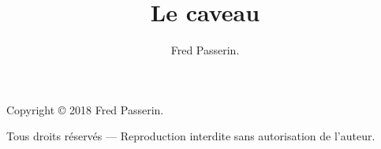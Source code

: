 \documentclass[a4paper,12pt,extrafontsizes,draft,twoside]{memoir}
\title{Le caveau}
\author{Fred Passerin.}
\date{}
\begin{document}
\maketitle


Copyright \copyright{} 2018 Fred Passerin.

\vspace{\baselineskip}
Tous droits réservés — Reproduction interdite sans autorisation de l'auteur.
\thispagestyle{empty}

\frontmatter



\mainmatter







%

\backmatter




\tableofcontents
\end{document}
